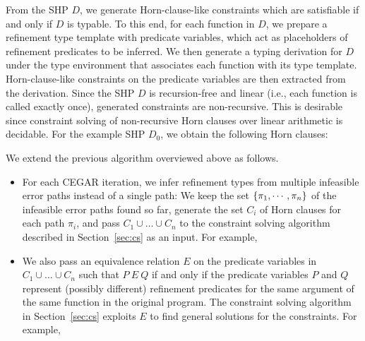 From the SHP \(D\), we generate Horn-clause-like constraints which are 
satisfiable if and only if \(D\) is typable.  To this end, for each 
function in \(D\), we prepare a refinement type template with predicate 
variables, which act as placeholders of refinement predicates to be 
inferred.  We then generate a typing derivation for \(D\) under the type 
environment that associates each function with its type template.  
Horn-clause-like constraints on the predicate variables are then 
extracted from the derivation.  Since the SHP \(D\) is recursion-free 
and linear (i.e., each function is called exactly once), generated 
constraints are non-recursive.  This is desirable since constraint 
solving of non-recursive Horn clauses over linear arithmetic is 
decidable.  For the example SHP \(D_0\), we obtain the following Horn 
clauses:\todo{}

We extend the previous algorithm overviewed above as follows.
\begin{itemize}
\item For each CEGAR iteration, we infer refinement types from multiple 
infeasible error paths instead of a single path:  We keep the set 
\(\{{\pi_1,\cdots,\pi_n}\}\) of the infeasible error paths found so far, 
generate the set \(C_i\) of Horn clauses for each path \(\pi_i\), and 
pass \(C_1 \cup \dots \cup C_n\) to the constraint solving algorithm 
described in Section~\ref{sec:cs} as an input.  For example, \todo{}
\item We also pass an equivalence relation \(E\) on the predicate 
variables in \(C_1 \cup \dots \cup C_n\) such that \(P\ E\ Q\) if and 
only if the predicate variables \(P\) and \(Q\) represent (possibly 
different) refinement predicates for the same argument of the same 
function in the original program.  The constraint solving algorithm in 
Section~\ref{sec:cs} exploits \(E\) to find general solutions for the 
constraints.  For example, \todo{}
\end{itemize}



